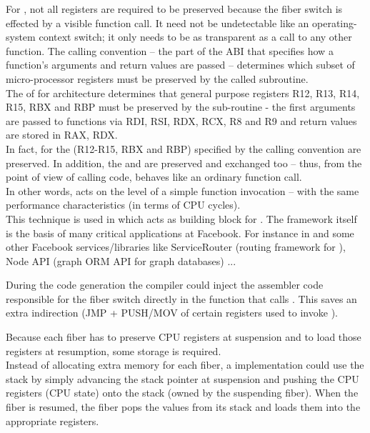 \label{callingconvention}
For \fiber, not all registers are required to be preserved because the fiber
switch is effected by a visible function call. It need not be undetectable like
an operating-system context switch; it only needs to be as transparent as a call
to any other function. The calling convention -- the part of the ABI that
specifies how a function's arguments and return values are passed -- determines
which subset of micro-processor registers must be preserved by the called
subroutine.\\

The \cite{SYSVABI} of  for 
architecture determines that general purpose registers R12, R13, R14, R15, RBX
and RBP must be preserved by the sub-routine - the first arguments are passed
to functions via RDI, RSI, RDX, RCX, R8 and R9 and return values are stored in
RAX, RDX.\\
In fact, for \resume the  (R12-R15, RBX and RBP)
specified by the calling convention are preserved. In addition, the  and  are preserved and exchanged too -- thus,
from the point of view of calling code, \resume behaves like an ordinary
function call.\\
In other words, \resume acts on the level of a simple function invocation --
with the same performance characteristics (in terms of CPU cycles).\\

This technique is used in \bcontext\cite{bcontext} which acts as building block
for \fbfibers. The \fbfibers\xspace framework itself is the basis of many
critical applications at Facebook. For instance in \fbmcrouter\cite{fbmcrouter}
and some other Facebook services/libraries like ServiceRouter (routing framework
for \fbthrift\cite{fbthrift}), Node API (graph ORM API for graph databases) ...

 During the code generation
the compiler could inject the assembler code responsible for the fiber switch
directly in the function that calls \resume. This saves an extra indirection
(JMP + PUSH/MOV of certain registers used to invoke \resume).

 Because each fiber has to preserve CPU
registers at suspension and to load those registers at resumption, some storage
is required.\\
Instead of allocating extra memory for each fiber, a implementation could use
the stack by simply advancing the stack pointer at suspension and pushing the
CPU registers (CPU state) onto the stack (owned by the suspending fiber). When
the fiber is resumed, the fiber pops the values from its stack and loads them
into the appropriate registers.\\

